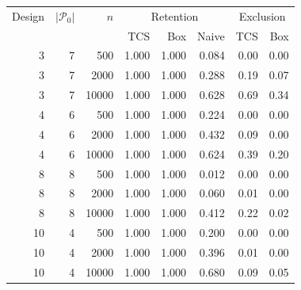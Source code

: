 \begin{tabular}{rrrrrrrr}\toprule
Design & $|\mathcal{P}_0|$ & $n$ & \multicolumn{3}{c}{Retention} & \multicolumn{2}{c}{Exclusion} \\
 & & & TCS & Box & Naive & TCS & Box \\\midrule
3 & 7 & 500 & 1.000 & 1.000 & 0.084 & 0.00 & 0.00 \\
3 & 7 & 2000 & 1.000 & 1.000 & 0.288 & 0.19 & 0.07 \\
3 & 7 & 10000 & 1.000 & 1.000 & 0.628 & 0.69 & 0.34 \\
4 & 6 & 500 & 1.000 & 1.000 & 0.224 & 0.00 & 0.00 \\
4 & 6 & 2000 & 1.000 & 1.000 & 0.432 & 0.09 & 0.00 \\
4 & 6 & 10000 & 1.000 & 1.000 & 0.624 & 0.39 & 0.20 \\
8 & 8 & 500 & 1.000 & 1.000 & 0.012 & 0.00 & 0.00 \\
8 & 8 & 2000 & 1.000 & 1.000 & 0.060 & 0.01 & 0.00 \\
8 & 8 & 10000 & 1.000 & 1.000 & 0.412 & 0.22 & 0.02 \\
10 & 4 & 500 & 1.000 & 1.000 & 0.200 & 0.00 & 0.00 \\
10 & 4 & 2000 & 1.000 & 1.000 & 0.396 & 0.01 & 0.00 \\
10 & 4 & 10000 & 1.000 & 1.000 & 0.680 & 0.09 & 0.05 \\
\bottomrule\end{tabular}